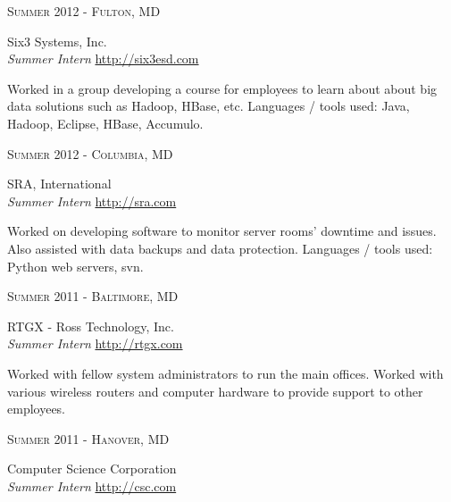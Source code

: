 \documentclass[10pt]{article} %
\begin{document}
{\begin{minipage}[t]{0.5\textwidth}
{\raggedleft\textsc{Summer 2012 - Fulton, MD}\par}

{\raggedright\large Six3 Systems, Inc. \\
\textit{Summer Intern} \hfill {\small \href{http://six3esd.com}{http://six3esd.com}} \\[5pt]}

\normalsize{Worked in a group developing a course for employees to learn about about big data solutions such as Hadoop, HBase, etc. Languages / tools used: Java, Hadoop, Eclipse, HBase,
Accumulo.}


{\raggedleft\textsc{Summer 2012 - Columbia, MD}\par}

{\raggedright\large SRA, International \\
\textit{Summer Intern} \hfill {\small \href{http://sra.com}{http://sra.com}} \\[5pt]}

\normalsize{Worked on developing software to monitor server rooms' downtime and issues. Also assisted with data backups and data protection. Languages / tools used: Python web servers, svn.}\\


{\raggedleft\textsc{Summer 2011 - Baltimore, MD}\par}

{\raggedright\large RTGX - Ross Technology, Inc. \\
\textit{Summer Intern} \hfill {\small \href{http://rtgx.com}{http://rtgx.com}} \\[5pt]}

\normalsize{Worked with fellow system administrators to run the main offices. Worked with various wireless routers and computer hardware to provide support to other employees.} \\


{\raggedleft\textsc{Summer 2011 - Hanover, MD}\par}

{\raggedright\large Computer Science Corporation \\
    \textit{Summer Intern } \hfill {\small \href{http://cscc.om}{http://csc.com}} \\[5pt]} 


\end{minipage}}
\end{document}

